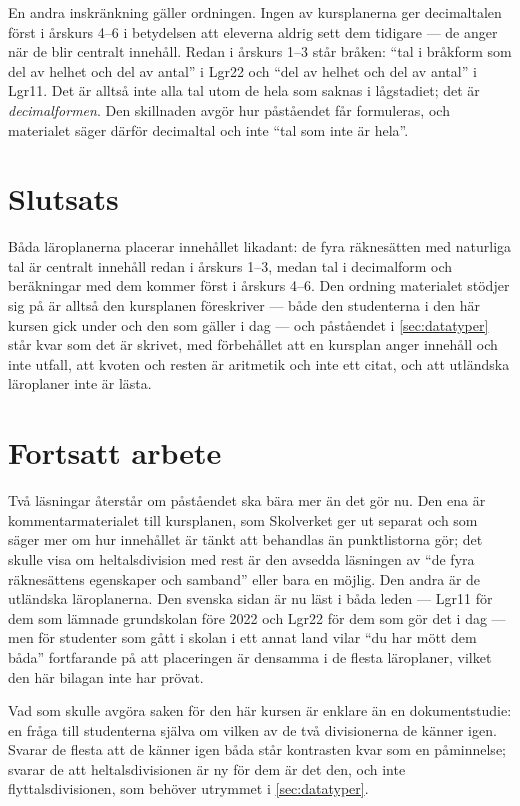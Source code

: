 En andra inskränkning gäller ordningen.  Ingen av kursplanerna ger
decimaltalen först i årskurs 4--6 i betydelsen att eleverna aldrig sett
dem tidigare --- de anger när de blir centralt innehåll.  Redan i
årskurs 1--3 står bråken: \enquote{tal i bråkform som del av helhet och
del av antal} i Lgr22\autocite[55]{Skolverket2022Lgr22} och \enquote{del
av helhet och del av antal} i Lgr11\autocite[55]{Skolverket2019Lgr11}.
Det är alltså inte alla tal utom de hela som saknas i lågstadiet; det är
\emph{decimalformen}.  Den skillnaden avgör hur påståendet får
formuleras, och materialet säger därför decimaltal och inte \enquote{tal
som inte är hela}.

\section{Slutsats}
\label{sec:lgr22-slutsats}

Båda läroplanerna placerar innehållet likadant: de fyra räknesätten med
naturliga tal är centralt innehåll redan i årskurs 1--3, medan tal i
decimalform och beräkningar med dem kommer först i årskurs 4--6.  Den
ordning materialet stödjer sig på är alltså den kursplanen föreskriver
--- både den studenterna i den här kursen gick under och den som gäller
i dag --- och påståendet i \cref{sec:datatyper} står kvar som det är
skrivet, med förbehållet att en kursplan anger innehåll och inte utfall,
att kvoten och resten är aritmetik och inte ett citat, och att
utländska läroplaner inte är lästa.

\section{Fortsatt arbete}
\label{sec:lgr22-fortsatt}

Två läsningar återstår om påståendet ska bära mer än det gör nu.  Den
ena är kommentarmaterialet till kursplanen, som Skolverket ger ut
separat och som säger mer om hur innehållet är tänkt att behandlas än
punktlistorna gör; det skulle visa om heltalsdivision med rest är den
avsedda läsningen av \enquote{de fyra räknesättens egenskaper och
samband} eller bara en möjlig.  Den andra är de utländska läroplanerna.
Den svenska sidan är nu läst i båda leden --- Lgr11 för dem som lämnade
grundskolan före 2022 och Lgr22 för dem som gör det i dag --- men för
studenter som gått i skolan i ett annat land vilar \enquote{du har mött
dem båda} fortfarande på att placeringen är densamma i de flesta
läroplaner, vilket den här bilagan inte har prövat.

Vad som skulle avgöra saken för den här kursen är enklare än en
dokumentstudie: en fråga till studenterna själva om vilken av de två
divisionerna de känner igen.  Svarar de flesta att de känner igen båda
står kontrasten kvar som en påminnelse; svarar de att heltalsdivisionen
är ny för dem är det den, och inte flyttalsdivisionen, som behöver
utrymmet i \cref{sec:datatyper}.
